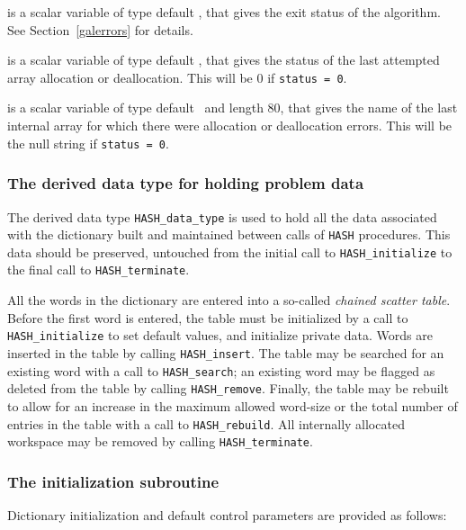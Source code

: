 \documentclass{galahad}
\newcommand{\packagename}{HASH}
\begin{document}
\begin{description}
 is a scalar variable of type default \integer, that gives the
exit status of the algorithm.
See Section~\ref{galerrors} for details.

 is a scalar variable of type default \integer, that gives
the status of the last attempted array allocation or deallocation.
This will be 0 if {\tt status = 0}.

 is a scalar variable of type default \character\
and length 80, that  gives the name of the last internal array
for which there were allocation or deallocation errors.
This will be the null string if {\tt status = 0}.

\end{description}


\subsubsection{The derived data type for holding problem data}\label{typedata}
The derived data type
{\tt \packagename\_data\_type}
is used to hold all the data associated with the dictionary built
and maintained between calls of {\tt \packagename} procedures.
This data should be preserved, untouched 
from the initial call to
{\tt \packagename\_initialize}
to the final call to
{\tt \packagename\_terminate}.


\galarguments
All the words in the dictionary are entered into a so-called
{\em chained scatter table}. Before the first word is entered, the
table must be initialized by a call to {\tt \packagename\_initialize}
to set default values, and initialize private data.
Words are inserted in the table by calling {\tt \packagename\_insert}. 
The table may be searched for an existing word with a call to 
{\tt \packagename\_search}; an existing word may be flagged as deleted
from the table by calling {\tt \packagename\_remove}. 
Finally, the table may be rebuilt to
allow for an increase in the maximum allowed word-size or the total
number of entries in the table with a call to {\tt \packagename\_rebuild}.
All internally allocated workspace may be removed by calling
{\tt \packagename\_terminate}.


\subsubsection{The initialization subroutine}\label{subinit}
Dictionary initialization and default control parameters 
are provided as follows:
\vspace*{1mm}
\end{document}
